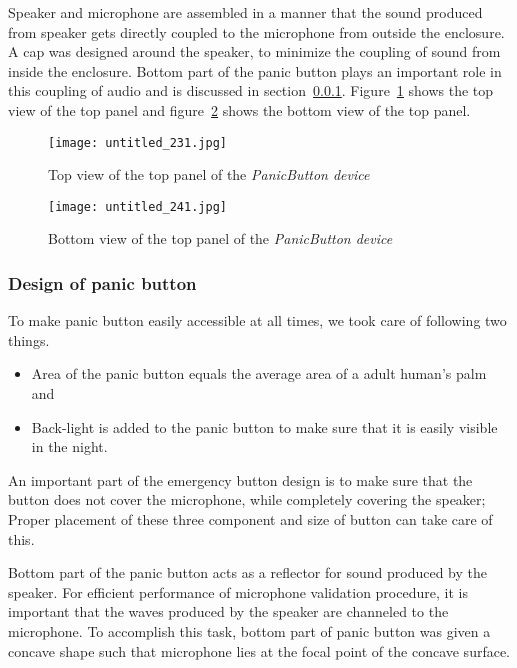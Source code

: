 Speaker and microphone are assembled in a manner that the sound produced from speaker gets directly coupled to the microphone from outside the enclosure. A cap was designed around the speaker, to minimize the coupling of sound from inside the enclosure. Bottom part of the panic button plays an important role in this coupling of audio and is discussed in section~\ref{sssec:designemergency}. Figure~\ref{fig:toptop} shows the top view of the top panel and figure~\ref{fig:bottomtop} shows the bottom view of the top panel.

\begin{figure}[H]
\centering
\texttt{[image: untitled\_231.jpg]}
\caption{Top view of the top panel of the \emph{PanicButton device}}
\label{fig:toptop}
\end{figure}

\begin{figure}[H]
\centering
\texttt{[image: untitled\_241.jpg]}
\caption{Bottom view of the top panel of the \emph{PanicButton device}}
\label{fig:bottomtop}
\end{figure}

\subsubsection{Design of panic button}
\label{sssec:designemergency}
To make panic button easily accessible at all times, we took care of following two things.
\begin{itemize}
\item Area of the panic button equals the average area of a adult human's palm and
\item Back-light is added to the panic button to make sure that it is easily visible in the night. 
\end{itemize}

An important part of the emergency button design is to make sure that the button does not cover the microphone, while completely covering the speaker; Proper placement of these three component and size of button can take care of this.

Bottom part of the panic button acts as a reflector for sound produced by the speaker. For efficient performance of microphone validation procedure, it is important that the waves produced by the speaker are channeled to the microphone. To accomplish this task, bottom part of panic button was given a concave shape such that microphone lies at the focal point of the concave surface.

